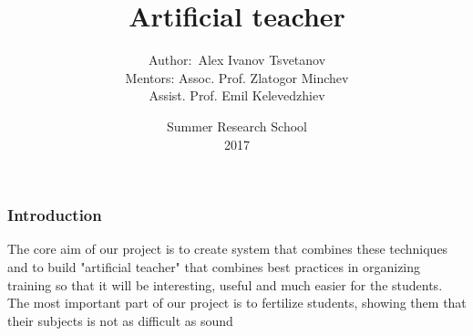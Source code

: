 \documentclass[12pt]{beamer}
\begin{document}
	
	\date[SRS'17]{Summer Research School \\ 2017}
	\author[Mr. Zlatogor Minchev, Alex]{
		\begin{table}[]
			\begin{tabular}{rl}
				\normalsize{Author:\      } & \normalsize{Alex Ivanov Tsvetanov} \\
				\scriptsize{Mentors:     } & \scriptsize{Assoc. Prof. Zlatogor Minchev} \\
				& \scriptsize{Assist. Prof. Emil Kelevedzhiev} \\
			\end{tabular}
		\end{table}
	}
	\title[ArtTeach]{Artificial teacher}
	
	\begin{frame}
		\titlepage
	\end{frame}

	\begin{frame}
		\frametitle{Introduction}
		\begin{block}{}
			The core aim of our project is to create system that combines these techniques and to build "artificial teacher" that combines best practices in organizing training so that it will be interesting, useful and much easier for the students. The most important part of our project is to fertilize students, showing them that their subjects is not as difficult as sound
		\end{block}
	\end{frame}
	
\end{document}
